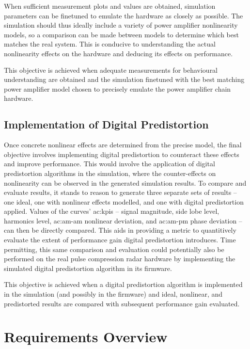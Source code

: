 When sufficient measurement plots and values are obtained, simulation parameters can be finetuned to emulate the hardware as closely as possible. The simulation should thus ideally include a variety of power amplifier nonlinearity models, so a comparison can be made between models to determine which best matches the real system. This is conducive to understanding the actual nonlinearity effects on the hardware and deducing its effects on performance.

This objective is achieved when adequate measurements for behavioural understanding are obtained and the simulation finetuned with the best matching power amplifier model chosen to precisely emulate the power amplifier chain hardware. 

\subsection{Implementation of Digital Predistortion}

Once concrete nonlinear effects are determined from the precise model, the final objective involves implementing digital predistortion to counteract these effects and improve performance. This would involve the application of digital predistortion algorithms in the simulation, where the counter-effects on nonlinearity can be observed in the generated simulation results. To compare and evaluate results, it stands to reason to generate three separate sets of results – one ideal, one with nonlinear effects modelled, and one with digital predistortion applied. Values of the curves’ \glspl{ac:kpi} – signal magnitude, side lobe level, harmonics level, \gls{ac:am-am} nonlinear deviation, and \gls{ac:am-pm} phase deviation – can then be directly compared. This aids in providing a metric to quantitively evaluate the extent of performance gain digital predistortion introduces. Time permitting, this same comparison and evaluation could potentially also be performed on the real pulse compression radar hardware by implementing the simulated digital predistortion algorithm in its firmware.

This objective is achieved when a digital predistortion algorithm is implemented in the simulation (and possibly in the firmware) and ideal, nonlinear, and predistorted results are compared with subsequent performance gain evaluated.  

\section{Requirements Overview}

